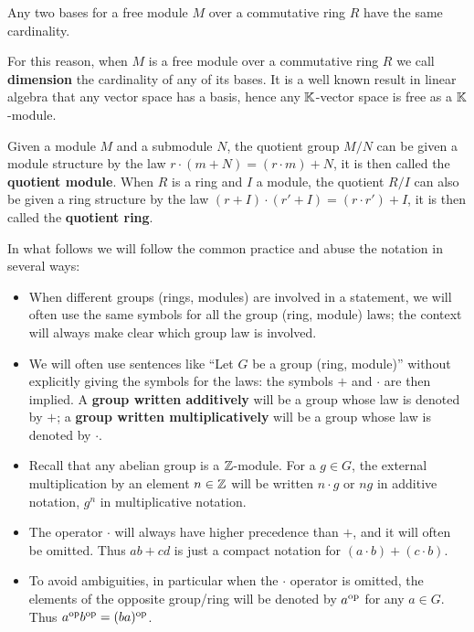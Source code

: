 \begin{proposition}
  \label{th:invariant-basis}
  Any two bases for a free module $M$ over a commutative ring $R$ have
  the same cardinality.
\end{proposition}

For this reason, when $M$ is a free module over a commutative ring $R$
we call  
\textbf{dimension} the cardinality of
any of its bases. It is a well known result in linear algebra that any
vector space has a basis, hence any $\mathbb{K}$-vector space is free as a
$\mathbb{K}$-module.

Given a module $M$ and a submodule $N$, the quotient group $M/N$ can
be given a module structure by the law $r\cdot(m+N)=(r\cdot m)+N$, it
is then called the \textbf{quotient
  module}. When $R$ is a ring and $I$ a module, the quotient $R/I$ can
also be given a ring structure by the law $(r+I)\cdot(r'+I)=(r\cdot
r')+I$, it is then called the \textbf{quotient
  ring}.

In what follows we will follow the common practice and abuse the
notation in several ways:
\begin{itemize}
\item When different groups (rings, modules) are involved in a
  statement, we will often use the same symbols for all the group
  (ring, module) laws; the context will always make clear which group
  law is involved.
\item We will often use sentences like ``Let $G$ be a group (ring,
  module)'' without explicitly giving the symbols for the laws: the
  symbols $+$ and $\cdot$ are then implied. A
  \textbf{group written additively}
  will be a group whose law is denoted by $+$; a
  \textbf{group written
    multiplicatively} will be a group whose law is denoted by $\cdot$.
\item Recall that any abelian group is a $\mathbb{Z}$-module. For a $g\in G$,
  the external multiplication by an element $n\in\mathbb{Z}$ will be written
  $n\cdot g$ or $ng$ in additive notation, $g^n$ in multiplicative
  notation.
\item The operator $\cdot$ will always have higher precedence than
  $+$, and it will often be omitted. Thus $ab+cd$ is just a compact
  notation for $(a\cdot b) + (c\cdot b)$.
\item To avoid ambiguities, in particular when the $\cdot$ operator is
  omitted, the elements of the opposite group/ring will be denoted by
  $a^{\mathrm{op}}$ for any $a\in G$. Thus $a^{\mathrm{op}} b^{\mathrm{op}}=(ba)^{\mathrm{op}}$.
\end{itemize}


